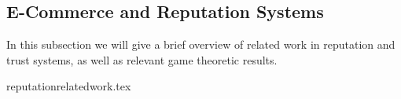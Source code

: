 \subsection{E-Commerce and Reputation Systems}
\label{sec:literaturereview:ecommerce}
  In this subsection we will give a brief overview of related work in reputation and trust
  systems, as well as relevant game theoretic results.

  {reputationrelatedwork.tex}
